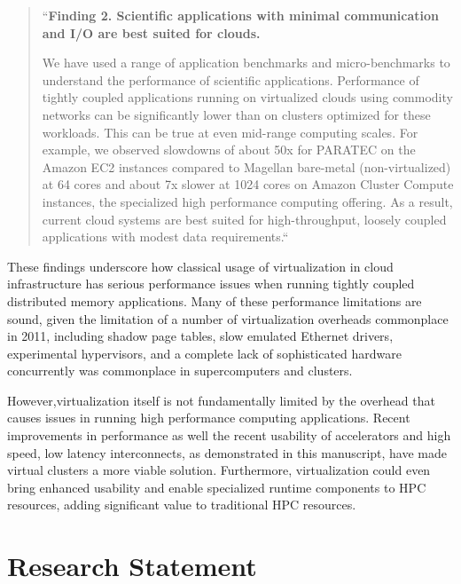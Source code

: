 \begin{quote}
``\textbf{Finding 2. Scientific applications with minimal communication and I/O are best suited for
clouds.}

We have used a range of application benchmarks and micro-benchmarks to understand the performance of scientific applications. Performance of tightly coupled applications running on virtualized clouds using commodity networks can be significantly lower than on clusters optimized for these workloads. This can be true at even mid-range computing scales. For example, we observed slowdowns of about 50x for PARATEC on the Amazon EC2 instances compared to Magellan bare-metal (non-virtualized) at 64 cores and about 7x slower at 1024 cores on Amazon Cluster Compute instances, the specialized high performance computing offering. As a result, current cloud systems are best suited for high-throughput, loosely coupled applications with modest data requirements.``
\end{quote}

These findings underscore how classical usage of virtualization in cloud infrastructure has serious performance issues when running tightly coupled distributed memory applications. Many of these performance limitations are sound, given the limitation of a number of virtualization overheads commonplace in 2011, including shadow page tables, slow emulated Ethernet drivers, experimental hypervisors, and a complete lack of sophisticated hardware concurrently was commonplace in supercomputers and clusters. 

However,virtualization itself is not fundamentally limited by the overhead that causes issues in running high performance computing applications. Recent improvements in performance as well the recent usability of accelerators and high speed, low latency interconnects, as demonstrated in this manuscript, have made virtual clusters a more viable solution.  Furthermore, virtualization could even bring enhanced usability and enable specialized runtime components to HPC resources, adding significant value to traditional HPC resources.  



\section{Research Statement}
\label{sec:stmt}

